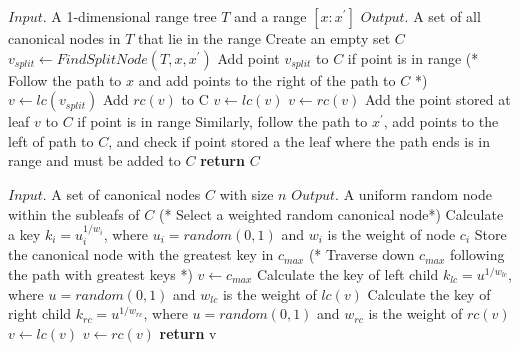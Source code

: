 \documentclass{article}
\begin{document}
\begin{algorithm}
\caption{$FindCanonicalSet(T,[x:x^\prime]$}
\begin{algorithmic}[1]
    \Statex $Input.$ A 1-dimensional range tree $T$ and a range $[x:x^\prime]$
    \Statex $Output.$ A set of all canonical nodes in $T$ that lie in the range
    \State Create an empty set $C$
    \State $v_{split} \gets FindSplitNode(T, x, x^\prime)$
        \State Add point $v_{split}$ to $C$ if point is in range 
    \Else
        \State (* Follow the path to $x$ and add points to the right of the path to $C$ *)
        \State $v \gets lc(v_{split})$
                \State Add $rc(v)$ to C
                \State $v \gets lc(v)$
            \Else 
                \State $v \gets rc(v)$
            \EndIf
        \EndWhile
        \State Add the point stored at leaf $v$ to $C$ if point is in range
        \State Similarly, follow the path to $x^\prime$, add points to the left of path to $C$, and \Statex \hspace{11.5 pt} check if point stored a the leaf where the path ends is in range and must \Statex \hspace{11.5 pt} be added to $C$
    \EndIf
    \State \textbf{return} $C$
\end{algorithmic}
\end{algorithm}

\begin{algorithm}
\caption{$UniformRandomNode(C)$}
\begin{algorithmic}[1]
    \Statex $Input.$ A set of canonical nodes $C$ with size $n$
    \Statex $Output.$ A uniform random node within the subleafs of $C$  
    \State (* Select a weighted random canonical node*)
        \State Calculate a key $k_i = u_i^{1/w_i}$, where $u_i = random(0,1)$ and $w_i$ is the \Statex \hspace{11.5 pt} weight of node $c_i$
    \EndFor
    \State Store the canonical node with the greatest key in $c_{max}$
    \State (* Traverse down $c_{max}$ following the path with greatest keys *)
    \State $v \gets c_{max}$
        \State Calculate the key of left child $k_{lc} = u^{1/w_{lc}}$, where $u = random(0,1)$ and \Statex \hspace{11.5 pt} $w_{lc}$ is the weight of $lc(v)$
        \State Calculate the key of right child $k_{rc} = u^{1/w_{rc}}$, where $u = random(0,1)$ \Statex \hspace{11.5 pt} and $w_{rc}$ is the weight of $rc(v)$
            \State $v \gets lc(v)$
        \Else
            \State $v \gets rc(v)$
        \EndIf
    \EndWhile
    \State \textbf{return} v
\end{algorithmic}
\end{algorithm}
\end{document}
